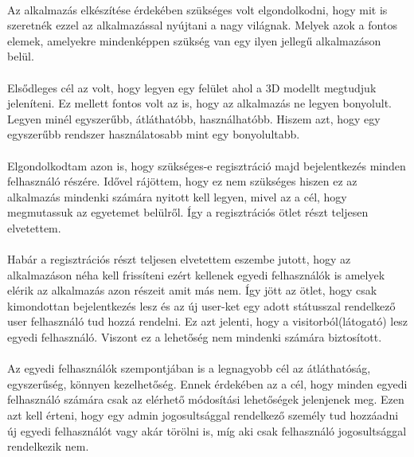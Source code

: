 	\paragraph{}
	Az alkalmazás elkészítése érdekében szükséges volt elgondolkodni, hogy mit is szeretnék ezzel az alkalmazással nyújtani a nagy világnak. Melyek azok a fontos elemek, amelyekre mindenképpen szükség van egy ilyen jellegű alkalmazáson belül.
	\paragraph{}
	Elsődleges cél az volt, hogy legyen egy felület ahol a 3D modellt megtudjuk jeleníteni. Ez mellett fontos volt az is, hogy az alkalmazás ne legyen bonyolult. Legyen minél egyszerűbb, átláthatóbb, használhatóbb. Hiszem azt, hogy egy egyszerűbb rendszer használatosabb mint egy bonyolultabb.
	\paragraph{}
	Elgondolkodtam azon is, hogy szükséges-e regisztráció majd bejelentkezés minden felhasználó részére. Idővel rájöttem, hogy ez nem szükséges hiszen ez az alkalmazás mindenki számára nyitott kell legyen, mivel az a cél, hogy megmutassuk az egyetemet belülről. Így a regisztrációs ötlet részt teljesen elvetettem.
	\paragraph{}
	Habár a regisztrációs részt teljesen elvetettem eszembe jutott, hogy az alkalmazáson néha kell frissíteni ezért kellenek egyedi felhasználók is amelyek elérik az alkalmazás azon részeit amit más nem. Így jött az ötlet, hogy csak kimondottan bejelentkezés lesz és az új user-ket egy adott státusszal rendelkező user felhasználó tud hozzá rendelni. Ez azt jelenti, hogy a visitorból(látogató) lesz egyedi felhasználó. Viszont ez a lehetőség nem mindenki számára biztosított.
	\paragraph{}
	Az egyedi felhasználók szempontjában is a legnagyobb cél az átláthatóság, egyszerűség, könnyen kezelhetőség. Ennek érdekében az a cél, hogy minden egyedi felhasználó számára csak az elérhető módosítási lehetőségek jelenjenek meg. Ezen azt kell érteni, hogy egy admin jogosultsággal rendelkező személy tud hozzáadni új egyedi felhasználót vagy akár törölni is, míg aki csak felhasználó jogosultsággal rendelkezik nem.
